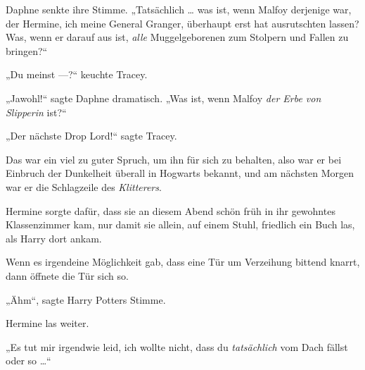 Daphne senkte ihre Stimme.
„Tatsächlich … was ist, wenn Malfoy derjenige war, der Hermine, ich meine General Granger, überhaupt erst hat ausrutschten lassen? Was, wenn er darauf aus ist, \emph{alle} Muggelgeborenen zum Stolpern und Fallen zu bringen?“

„Du meinst —?“ keuchte Tracey.

„Jawohl!“ sagte Daphne dramatisch.
„Was ist, wenn Malfoy \emph{der Erbe von} \emph{Slipperin} ist?“%

„Der nächste Drop Lord!“%
sagte Tracey.

Das war ein viel zu guter Spruch, um ihn für sich zu behalten, also war er bei Einbruch der Dunkelheit überall in Hogwarts bekannt, und am nächsten Morgen war er die Schlagzeile des \emph{Klitterers}.


Hermine sorgte dafür, dass sie an diesem Abend schön früh in ihr gewohntes Klassenzimmer kam, nur damit sie allein, auf einem Stuhl, friedlich ein Buch las, als Harry dort ankam.

Wenn es irgendeine Möglichkeit gab, dass eine Tür um Verzeihung bittend knarrt, dann öffnete die Tür sich so.

„Ähm“, sagte Harry Potters Stimme.

Hermine las weiter.

„Es tut mir irgendwie leid, ich wollte nicht, dass du \emph{tatsächlich} vom Dach fällst oder so …“

